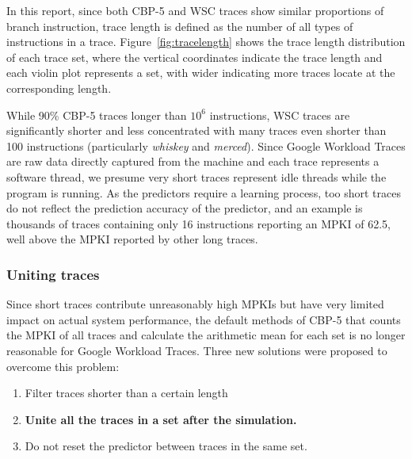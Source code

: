 In this report, since both CBP-5 and WSC traces show similar proportions of branch instruction, trace length is defined as the number of all types of instructions in a trace. Figure~\ref{fig:tracelength} shows the trace length distribution of each trace set, where the vertical coordinates indicate the trace length and each violin plot represents a set, with wider indicating more traces locate at the corresponding length.\par\hspace*{\fill}\par

While 90\% CBP-5 traces longer than $10^6$ instructions, WSC traces are significantly shorter and less concentrated with many traces even shorter than 100 instructions (particularly \textit{whiskey} and \textit{merced}). Since Google Workload Traces\cite{noauthor_google_nodate} are raw data directly captured from the machine and each trace represents a software thread, we presume very short traces represent idle threads while the program is running. As the predictors require a learning process, too short traces do not reflect the prediction accuracy of the predictor, and an example is thousands of traces containing only 16 instructions reporting an MPKI of 62.5, well above the MPKI reported by other long traces. 

\subsubsection{Uniting traces}

Since short traces contribute unreasonably high MPKIs but have very limited impact on actual system performance, the default methods of CBP-5 that counts the MPKI of all traces and calculate the arithmetic mean for each set is no longer reasonable for Google Workload Traces. Three new solutions were proposed to overcome this problem: 

\begin{enumerate}[itemsep= 0pt,topsep = 0pt, partopsep=4 pt, leftmargin= 32 pt]
\item Filter traces shorter than a certain length 
\item \textbf{Unite all the traces in a set after the simulation. }
\item Do not reset the predictor between traces in the same set.
\end{enumerate}

